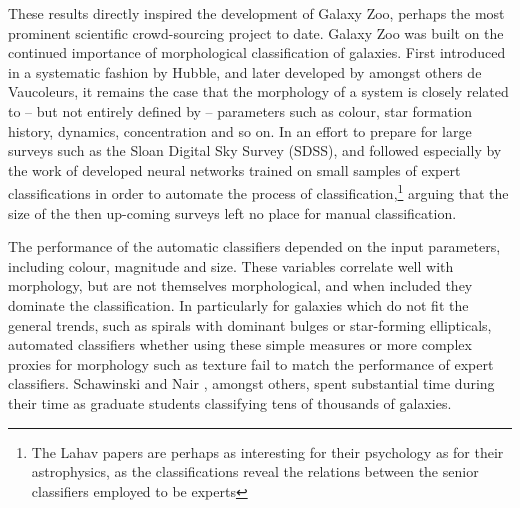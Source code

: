 \documentclass{ar2e}
\begin{document}


These results directly inspired the development of Galaxy Zoo, perhaps the most
prominent scientific crowd-sourcing project to date. Galaxy Zoo was built on the
continued importance of morphological classification of galaxies. First
introduced in a systematic fashion by Hubble, and later developed by amongst
others de Vaucoleurs, it remains the case that the morphology of a system is
closely related to -- but not entirely defined by -- parameters such as colour,
star formation history, dynamics, concentration and so on.  In an effort to
prepare for large surveys such as the Sloan Digital Sky Survey (SDSS), \citet{Lahav1995} and \citet{Lahav1996} followed especially by the work of \citet{Ball} developed neural networks
trained on small samples of expert classifications in order to automate the
process of classification,\footnote{The Lahav papers are perhaps as interesting
for their psychology as for their astrophysics, as the classifications reveal
the relations between the senior classifiers employed to be experts} arguing
that the size of the then up-coming surveys left no place for manual
classification.


The performance of the automatic classifiers depended on the input parameters,
including colour, magnitude and size. These variables correlate well with
morphology, but are not themselves morphological, and when included they
dominate the classification. In particularly for galaxies which do not fit the
general trends, such as spirals with dominant bulges or star-forming
ellipticals, automated classifiers whether using these simple measures or more
complex proxies for morphology such as texture fail to match the performance
of expert classifiers. Schawinski \citep{Scha2007} and Nair \citep{Nair}, amongst others, spent substantial
time during their time as graduate students classifying tens of thousands of
galaxies. 
\end{document}
